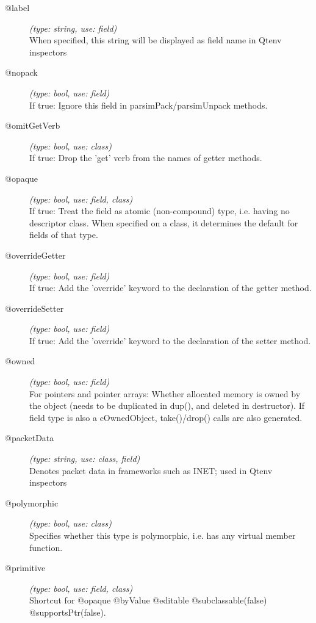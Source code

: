 \begin{description}
\item[@label] \textit{(type: string, use: field)} \\
  When specified, this string will be displayed as field name in Qtenv
  inspectors

\item[@nopack] \textit{(type: bool, use: field)} \\
  If true: Ignore this field in parsimPack/parsimUnpack methods.

\item[@omitGetVerb] \textit{(type: bool, use: class)} \\
  If true: Drop the 'get' verb from the names of getter methods.

\item[@opaque] \textit{(type: bool, use: field, class)} \\
  If true: Treat the field as atomic (non-compound) type, i.e. having no
  descriptor class. When specified on a class, it determines the default for
  fields of that type.

\item[@overrideGetter] \textit{(type: bool, use: field)} \\
  If true: Add the 'override' keyword to the declaration of the getter method.

\item[@overrideSetter] \textit{(type: bool, use: field)} \\
  If true: Add the 'override' keyword to the declaration of the setter method.

\item[@owned] \textit{(type: bool, use: field)} \\
  For pointers and pointer arrays: Whether allocated memory is owned by the
  object (needs to be duplicated in dup(), and deleted in destructor). If
  field type is also a cOwnedObject, take()/drop() calls are also generated.

\item[@packetData] \textit{(type: string, use: class, field)} \\
  Denotes packet data in frameworks such as INET; used in Qtenv inspectors

\item[@polymorphic] \textit{(type: bool, use: class)} \\
  Specifies whether this type is polymorphic, i.e. has any virtual member
  function.

\item[@primitive] \textit{(type: bool, use: field, class)} \\
  Shortcut for @opaque @byValue @editable @subclassable(false)
  @supportsPtr(false).


\end{description}
